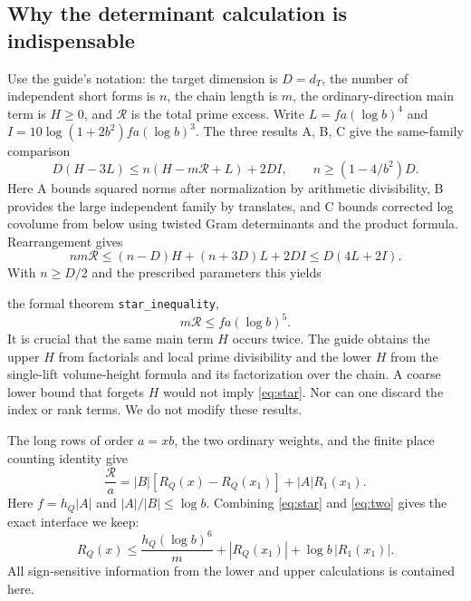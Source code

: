 \documentclass[11pt,a4paper]{article}
\theoremstyle{remark}\newtheorem{remark}[theorem]{Remark}
\begin{document}
\subsection{Why the determinant calculation is indispensable}
Use the guide's notation: the target dimension is $D=d_T$, the number of independent short forms is $n$, the chain length is $m$, the ordinary-direction main term is $H\ge0$, and $\mathcal R$ is the total prime excess. Write $L=fa(\log b)^4$ and $I=10\log(1+2b^2)fa(\log b)^3$. The three results A, B, C give the same-family comparison
\begin{equation}\label{eq:compare}
D(H-3L)\le n(H-m\mathcal R+L)+2DI,\qquad n\ge (1-4/b^2)D.
\end{equation}
Here A bounds squared norms after normalization by arithmetic divisibility, B provides the large independent family by translates, and C bounds corrected log covolume from below using twisted Gram determinants and the product formula. Rearrangement gives
\[
nm\mathcal R\le (n-D)H+(n+3D)L+2DI\le D(4L+2I).
\]
With $n\ge D/2$ and the prescribed parameters this yields\par\noindent the formal theorem \texttt{star\_inequality},
\begin{equation}\label{eq:star}m\mathcal R\le fa(\log b)^5.\end{equation}
It is crucial that the same main term $H$ occurs twice. The guide obtains the upper $H$ from factorials and local prime divisibility and the lower $H$ from the single-lift volume-height formula and its factorization over the chain. A coarse lower bound that forgets $H$ would not imply \eqref{eq:star}. Nor can one discard the index or rank terms. We do not modify these results.

The long rows of order $a=xb$, the two ordinary weights, and the finite place counting identity give
\begin{equation}\label{eq:two}
\frac{\mathcal R}{a}=|B|[R_Q(x)-R_Q(x_1)]+|A|R_1(x_1).
\end{equation}
Here $f=h_Q|A|$ and $|A|/|B|\le\log b$. Combining \eqref{eq:star} and \eqref{eq:two} gives the exact interface we keep:
\begin{equation}\label{eq:cutoff}
R_Q(x)\le \frac{h_Q(\log b)^6}{m}+|R_Q(x_1)|+\log b\,|R_1(x_1)|.
\end{equation}
All sign-sensitive information from the lower and upper calculations is contained here.
\end{document}

